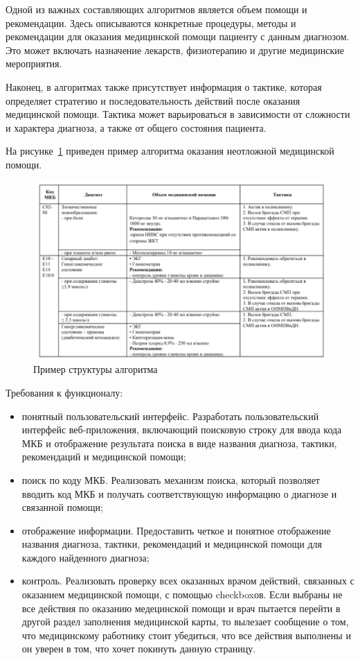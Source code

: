 Одной из важных составляющих алгоритмов является объем помощи и рекомендации. Здесь описываются конкретные процедуры, методы и рекомендации для оказания медицинской помощи пациенту с данным диагнозом. Это может включать назначение лекарств, физиотерапию и другие медицинские мероприятия.

Наконец, в алгоритмах также присутствует информация о тактике, которая определяет стратегию и последовательность действий после оказания медицинской помощи. Тактика может варьироваться в зависимости от сложности и характера диагноза, а также от общего состояния пациента.

На рисунке~\ref{fig:fig13} приведен пример алгоритма  оказания неотложной медицинской помощи.

     \begin{figure}
        \includegraphics[scale=0.6]{styles/diploma/inc/algo1.png}
        \caption{Пример структуры алгоритма}
        \label{fig:fig13}
    \end{figure}

Требования к функционалу:

\begin{itemize}
    \item понятный пользовательский интерфейс. Разработать пользовательский интерфейс веб-приложения, включающий поисковую строку для ввода кода МКБ и отображение результата поиска в виде названия диагноза, тактики, рекомендаций и медицинской помощи;
    \item поиск по коду МКБ. Реализовать механизм поиска, который позволяет вводить код МКБ и получать соответствующую информацию о диагнозе и связанной помощи;
    \item отображение информации. Предоставить четкое и понятное отображение названия диагноза, тактики, рекомендаций и медицинской помощи для каждого найденного диагноза;
    \item контроль. Реализовать проверку всех оказанных врачом действий, связанных с оказанием медицинской помощи, с помощью checkboxов. Если выбраны не все действия по оказанию медецинской помощи и врач пытается перейти в другой раздел заполнения медицинской карты, то вылезает сообщение о том, что медицинскому работнику стоит убедиться, что все действия выполнены и он уверен в том, что хочет покинуть данную страницу.
\end{itemize}
